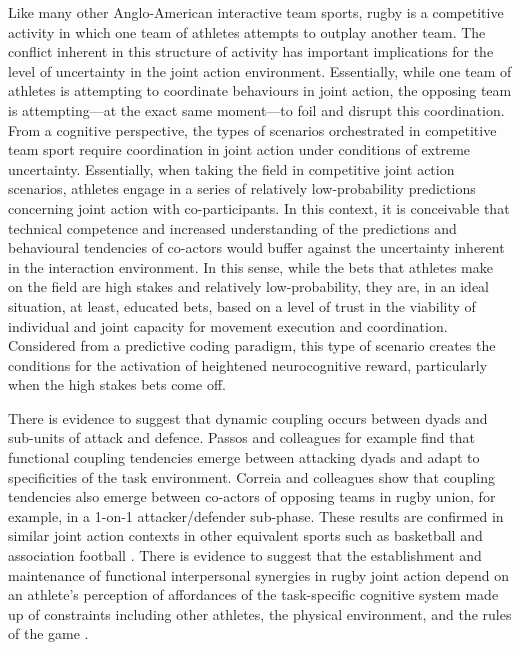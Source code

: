 Like many other Anglo-American interactive team sports, rugby is a competitive activity in which one team of athletes attempts to outplay another team.  The conflict inherent in this structure of activity has important implications for the level of uncertainty in the joint action environment.  Essentially, while one team of athletes is attempting to coordinate behaviours in joint action, the opposing team is attempting---at the exact same moment---to foil and disrupt this coordination.  From a cognitive perspective, the types of scenarios orchestrated in competitive team sport require coordination in joint action under conditions of extreme uncertainty.  Essentially, when taking the field in competitive joint action scenarios, athletes engage in a series of relatively low-probability predictions concerning joint action with co-participants.  In this context, it is conceivable that technical competence and increased understanding of the predictions and behavioural tendencies of co-actors would buffer against the uncertainty inherent in the interaction environment.  In this sense, while the bets that athletes make on the field are high stakes and relatively low-probability, they are, in an ideal situation, at least, educated bets, based on a level of trust in the viability of individual and joint capacity for movement execution and coordination.  Considered from a predictive coding paradigm, this type of scenario creates the conditions for the activation of heightened neurocognitive reward, particularly when the high stakes bets come off.

There is evidence to suggest that dynamic coupling occurs between dyads and sub-units of attack and defence\citep{Passos2011,Correia2014}.  Passos and colleagues \textcite{Passos2011} for example find that functional coupling tendencies emerge between attacking dyads and adapt to specificities of the task environment.  Correia and colleagues \textcite{Correia2014} show that coupling tendencies also emerge between co-actors of opposing teams in rugby union, for example, in a 1-on-1 attacker/defender sub-phase.  These results are confirmed in similar joint action contexts in other equivalent sports such as basketball and association football \citep{Duarte2013}. There is evidence to suggest that the establishment and maintenance of functional interpersonal synergies in rugby joint action depend on an athlete's perception of affordances of the task-specific cognitive system made up of constraints including other athletes, the physical environment, and the rules of the game \citep{Passos2012}.

